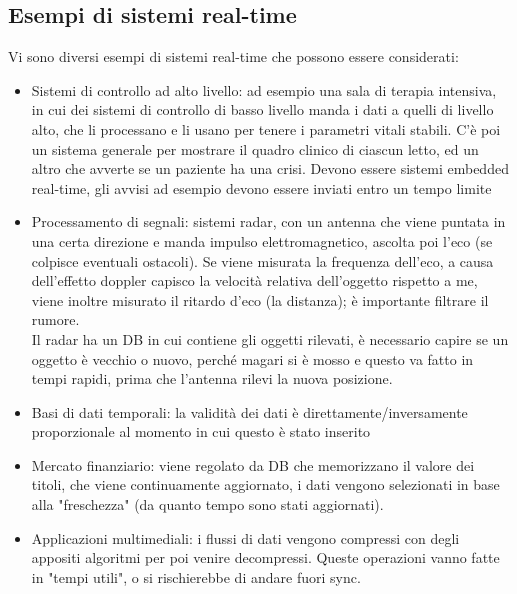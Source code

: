 \documentclass[12pt, oneside]{extbook}
\begin{document}
\subsection{Esempi di sistemi real-time}
Vi sono diversi esempi di sistemi real-time che possono essere considerati:
\begin{itemize}
\item Sistemi di controllo ad alto livello: ad esempio una sala di terapia intensiva, in cui dei sistemi di controllo di basso livello manda i dati a quelli di livello alto, che li processano e li usano per tenere i parametri vitali stabili. C'è poi un sistema generale per mostrare il quadro clinico di ciascun letto, ed un altro che avverte se un paziente ha una crisi. Devono essere sistemi embedded real-time, gli avvisi ad esempio devono essere inviati entro un tempo limite
\item Processamento di segnali: sistemi radar, con un antenna che viene puntata in una certa direzione e manda impulso elettromagnetico, ascolta poi l'eco (se colpisce eventuali ostacoli). Se viene misurata la frequenza dell'eco, a causa dell'effetto doppler capisco la velocità relativa dell'oggetto rispetto a me, viene inoltre misurato il ritardo d'eco (la distanza); è importante filtrare il rumore.\\ Il radar ha un DB in cui contiene gli oggetti rilevati, è necessario capire se un oggetto è vecchio o nuovo, perché magari si è mosso e questo va fatto in tempi rapidi, prima che l'antenna rilevi la nuova posizione.
\item Basi di dati temporali: la validità dei dati è direttamente/inversamente proporzionale al momento in cui questo è stato inserito
\item Mercato finanziario: viene regolato da DB che memorizzano il valore dei titoli, che viene continuamente aggiornato, i dati vengono selezionati in base alla "freschezza" (da quanto tempo sono stati aggiornati).
\item Applicazioni multimediali: i flussi di dati vengono compressi con degli appositi algoritmi per poi venire decompressi. Queste operazioni vanno fatte in "tempi utili", o si rischierebbe di andare fuori sync.
\end{itemize}
\end{document}
